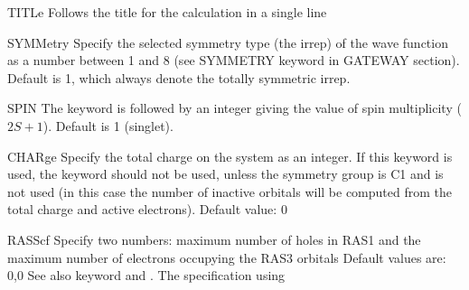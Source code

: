 \begin{keywordlist}
\item[TITLe]
Follows the title for the calculation in a single line
\item[SYMMetry]
Specify the selected symmetry type (the irrep) of the wave
function as a number between 1 and 8 (see SYMMETRY keyword in GATEWAY section). Default is 1, which always
denote the totally symmetric irrep.
\item[SPIN]
The keyword is followed by an integer giving the value of spin
multiplicity ($2S+1$). Default is 1 (singlet).
\item[CHARge]
Specify the total charge on the system as an integer. If this keyword is used, the
 keyword should not be used, unless the symmetry group is C1 and
 is not used (in this case the number of inactive orbitals will
be computed from the total charge and active electrons). Default value: 0
\item[RASScf]
Specify two numbers: maximum number of holes in RAS1 and the maximum number of electrons
occupying the RAS3 orbitals
Default values are: 0,0
See also keyword  and . The specification using

\end{keywordlist}
